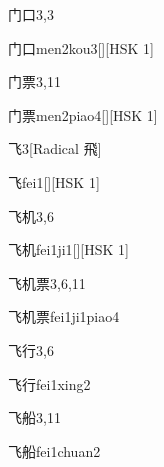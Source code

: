 \begin{entry}{门口}{3,3}
  \begin{phonetics}{门口}{men2kou3}[][HSK 1]
  \end{phonetics}
\end{entry}

\begin{entry}{门票}{3,11}
  \begin{phonetics}{门票}{men2piao4}[][HSK 1]
  \end{phonetics}
\end{entry}

\begin{entry}{飞}{3}[Radical 飛]
  \begin{phonetics}{飞}{fei1}[][HSK 1]
  \end{phonetics}
\end{entry}

\begin{entry}{飞机}{3,6}
  \begin{phonetics}{飞机}{fei1ji1}[][HSK 1]
  \end{phonetics}
\end{entry}

\begin{entry}{飞机票}{3,6,11}
  \begin{phonetics}{飞机票}{fei1ji1piao4}
  \end{phonetics}
\end{entry}

\begin{entry}{飞行}{3,6}
  \begin{phonetics}{飞行}{fei1xing2}
  \end{phonetics}
\end{entry}

\begin{entry}{飞船}{3,11}
  \begin{phonetics}{飞船}{fei1chuan2}
  \end{phonetics}
\end{entry}

